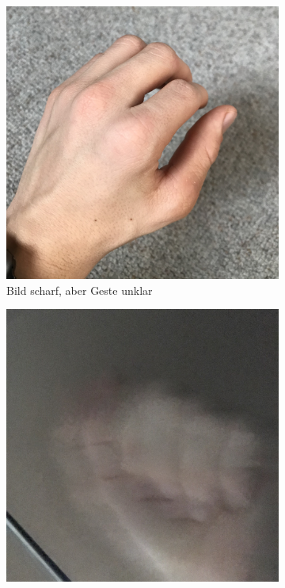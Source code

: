 \documentclass[12pt]{article}
\begin{document}
\begin{figure}
        \centering
        \begin{subfigure}[b]{0.475\textwidth}
            \centering
            \includegraphics[width=\textwidth]{pictures/unklargeste.jpg}
            \caption[]%
            {{\small Bild scharf, aber Geste unklar}}    
            \label{fig:unklargeste}
        \end{subfigure}
        \hfill
        \begin{subfigure}[b]{0.475\textwidth}  
            \centering 
            \includegraphics[width=\textwidth]{pictures/unklarlicht.jpg}

\end{subfigure}
\end{figure}
\end{document}
